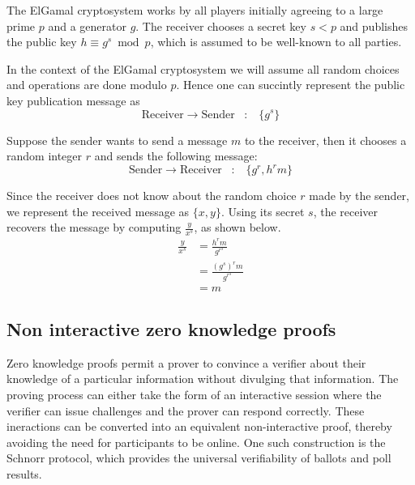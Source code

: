 The ElGamal cryptosystem works by all players initially agreeing to a large prime $p$
and a generator $g$.  The receiver chooses a secret key $s < p$ and publishes
the public key $h \equiv g^s \bmod p$, which is assumed to be well-known to
all parties.

In the context of the ElGamal cryptosystem
we will assume all random choices and operations are done
modulo $p$.  Hence one can succintly represent the
public key publication message as
\[
\text{Receiver} \rightarrow \text{Sender} \hspace{10pt} : \hspace{10pt} \{g^s\}  
\]

Suppose the sender wants to send a message $m$ to the receiver, then it chooses
a random integer $r$ and sends the following message:
\[
\text{Sender} \rightarrow \text{Receiver} \hspace{10pt} : \hspace{10pt} \{g^r, h^rm\}
\]

Since the receiver does not know about the random choice $r$ made by the sender, we
represent the received message as $\{x, y\}$.  Using its secret $s$, the receiver recovers
the message by computing $\frac{y}{x^s}$, as shown below.
\begin{equation} \label{eq1}
\begin{split}
\frac{y}{x^s} & = \frac{h^rm}{g^{r^s}} \\
              & = \frac{{{(g^s)}^r}m}{g^{r^s}}\\
              & = m
\end{split}
\end{equation}

\subsection{Non interactive zero knowledge proofs}

Zero knowledge proofs permit a prover to convince a verifier about their knowledge
of a particular information without divulging that information.  The proving
process can either take the form of an interactive session where the verifier
can issue challenges and the prover can respond correctly.  These ineractions can
be converted into an equivalent non-interactive proof, thereby avoiding the need for participants
to be online.  One such construction is the Schnorr protocol, which 
provides the universal verifiability of ballots and poll results.

